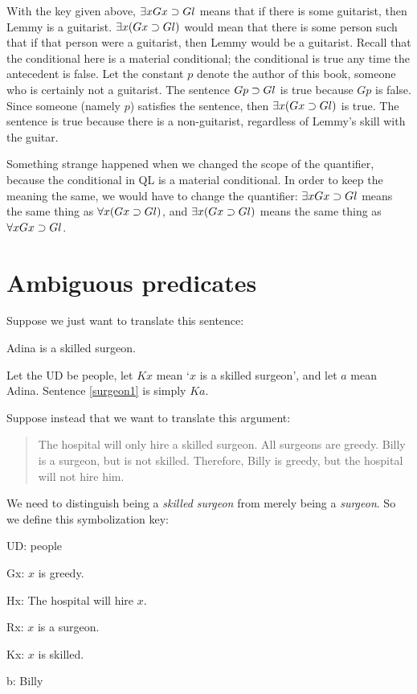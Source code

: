 With the key given above, $\exists x Gx \supset Gl$ means that if there is some guitarist, then Lemmy is a guitarist. $\exists x (Gx \supset Gl)$ would mean that there is some person such that if that person were a guitarist, then Lemmy would be a guitarist. Recall that the conditional here is a material conditional; the conditional is true any time the antecedent is false. Let the constant $p$ denote the author of this book, someone who is certainly not a guitarist. The sentence $Gp \supset Gl$ is true because $Gp$ is false. Since someone (namely $p$) satisfies the sentence, then $\exists x (Gx \supset Gl)$ is true. The sentence is true because there is a non-guitarist, regardless of Lemmy's skill with the guitar.

Something strange happened when we changed the scope of the quantifier, because the conditional in QL is a material conditional. In order to keep the meaning the same, we would have to change the quantifier: $\exists x Gx \supset Gl$ means the same thing as $\forall x (Gx \supset Gl)$, and $\exists x (Gx \supset Gl)$ means the same thing as $\forall x Gx \supset Gl$.



\section{Ambiguous predicates}

Suppose we just want to translate this sentence:
\begin{earg}
\item[\ex{surgeon1}] Adina is a skilled surgeon.
\end{earg}
Let the UD be people, let $Kx$ mean `$x$ is a skilled surgeon', and let $a$ mean Adina. Sentence \ref{surgeon1} is simply $Ka$.


Suppose instead that we want to translate this argument:
\begin{quote}
The hospital will only hire a skilled surgeon. All surgeons are greedy. Billy is a surgeon, but is not skilled. Therefore, Billy is greedy, but the hospital will not hire him.
\end{quote}
We need to distinguish being a \emph{skilled surgeon} from merely being a \emph{surgeon}. So we define this symbolization key:
\begin{ekey}
\item[UD:] people
\item[Gx:] $x$ is greedy.
\item[Hx:] The hospital will hire $x$.
\item[Rx:] $x$ is a surgeon.
\item[Kx:] $x$ is skilled.
\item[b:] Billy
\end{ekey}


